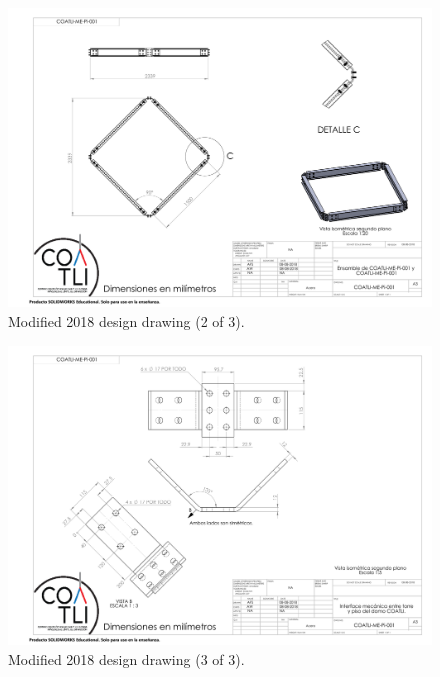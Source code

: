 \begin{figure}
\begin{center}
\includegraphics[height=0.95\linewidth,angle=90]{figures/buildings-coatli-drawing-2018-2.pdf}
\end{center}
\caption{{\projectname} Modified 2018 design drawing (2 of 3).}
\label{figure:buildings-drawing-2018-2}
\end{figure}

\begin{figure}
\begin{center}
\includegraphics[height=0.95\linewidth,angle=90]{figures/buildings-coatli-drawing-2018-3.pdf}
\end{center}
\caption{{\projectname} Modified 2018 design drawing (3 of 3).}
\label{figure:buildings-drawing-2018-3}
\end{figure}
\fi

